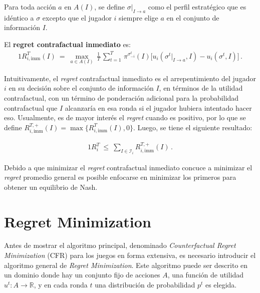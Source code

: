 Para toda acción $a$ en $A(I)$, se define $\sigma|_{I \rightarrow a}$ como el perfil estratégico que es idéntico a $\sigma$ excepto que el jugador $i$ siempre elige $a$ en el conjunto de información $I$.

\begin{definition}
\label{def:regret-inmediato}
El \textbf{regret contrafactual inmediato} es:
\begin{alignat}{1}
R_{i, \text{imm}}^T(I)\ =\  \max_{a \in A(I)} \, \frac{1}{T} \, \sum_{t = 1}^T \, \pi^{\sigma_{-i}^t}(I) \biggl[ u_i(\sigma^t|_{I \rightarrow a}, I) - u_i(\sigma^t, I) \biggr]\,.
\end{alignat}
\end{definition}

Intuitivamente, el \textit{regret} contrafactual inmediato es el arrepentimiento del jugador $i$ en su decisión sobre el conjunto de información $I$, en términos de la utilidad contrafactual, con un término de ponderación adicional para la probabilidad contrafactual que $I$ alcanzaría en esa ronda si el jugador hubiera intentado hacer eso. Usualmente, es de mayor interés el \textit{regret} cuando es positivo, por lo que se define $R_{i, \text{imm}}^{T, +} (I) = \max\{R^T_{i, \text{imm}} (I), 0\}$. Luego, se tiene el siguiente resultado:

\begin{theorem}[\textcolor{red}{\bf **** REF ****}]
\begin{alignat}{1}
R_i^T\ \leq\ \sum_{I \in \mathcal{I}_i} R_{i, \text{imm}}^{T, +}(I) \,.
\end{alignat}
\end{theorem}

Debido a que minimizar el \textit{regret} contrafactual inmediato concuce a minimizar el \textit{regret} promedio general es posible enfocarse en minimizar los primeros para obtener un equilibrio de Nash.

\section{Regret Minimization}

Antes de mostrar el algoritmo principal, denominado \textit{Counterfactual Regret Minimization} (CFR) para los juegos en forma extensiva, es necesario introducir el algoritmo general de \textit{Regret Minimization}. Este algoritmo puede ser descrito en un dominio donde hay un conjunto fijo de acciones $A$, una función de utilidad $u^t : A \rightarrow \mathbb{R}$, y en cada ronda $t$ una distribución de probabilidad $p^t$ es elegida.

